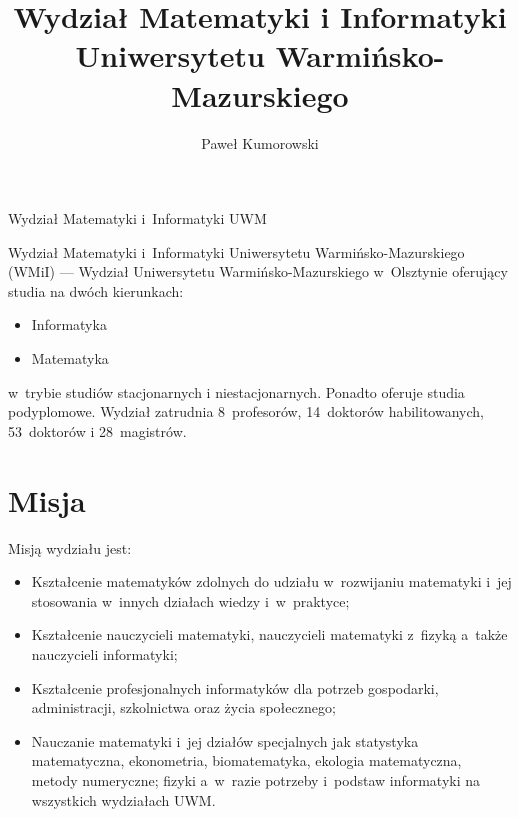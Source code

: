 \documentclass[a4paper,12pt]{article}
\title{Wydział Matematyki i Informatyki Uniwersytetu Warmińsko-Mazurskiego}
\author{Paweł Kumorowski}
\begin{document}
\maketitle
Wydział Matematyki i~Informatyki UWM
\begin{abstract}

\end{abstract}
Wydział Matematyki i~Informatyki Uniwersytetu Warmińsko-Mazurskiego (WMiI) --- Wydział Uniwersytetu Warmińsko-Mazurskiego w~Olsztynie oferujący studia na dwóch kierunkach:
\begin{itemize}
\item Informatyka
\item Matematyka
\end{itemize}
w~trybie studiów stacjonarnych i niestacjonarnych. Ponadto oferuje studia podyplomowe.
\newline
Wydział zatrudnia 8~profesorów, 14~doktorów habilitowanych, 53~doktorów i 28~magistrów.

\tableofcontents

\section{Misja}
Misją wydziału jest:
\begin{itemize}
\item{Kształcenie matematyków zdolnych do udziału w~rozwijaniu matematyki i~jej stosowania w~innych
działach wiedzy i~w~praktyce;}
\item{Kształcenie nauczycieli matematyki, nauczycieli matematyki z~fizyką a~także nauczycieli informatyki;}
\item{Kształcenie profesjonalnych informatyków dla potrzeb gospodarki, administracji, szkolnictwa oraz życia społecznego;}
\item{Nauczanie matematyki i~jej działów specjalnych jak statystyka matematyczna, ekonometria,
biomatematyka, ekologia matematyczna, metody numeryczne; fizyki a~w~razie potrzeby i~podstaw
informatyki na wszystkich wydziałach UWM.}
\end{itemize}
\end{document}
